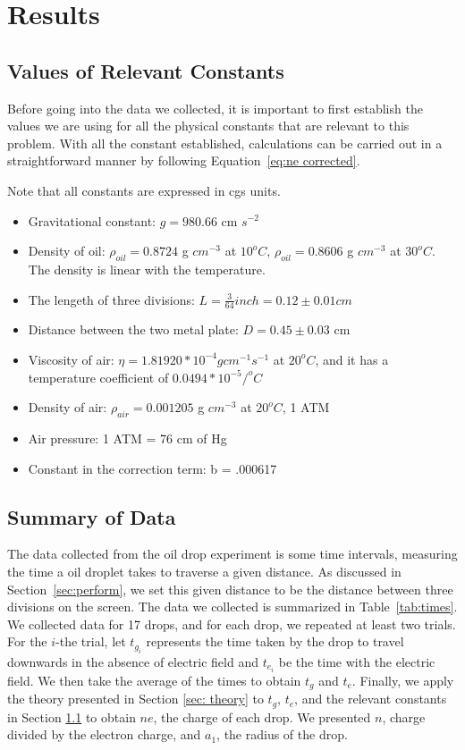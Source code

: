 \documentclass{article}
\begin{document}
\section{Results}

\subsection{Values of Relevant Constants}
\label{sec:constants}
Before going into the data we collected, it is important to first establish the values we are using for all the physical constants that are relevant to this problem. With all the constant established, calculations can be carried out in a straightforward manner by following Equation~\ref{eq:ne corrected}. 

Note that all constants are expressed in cgs units.

\begin{itemize}
    \item Gravitational constant: $g = 980.66$ cm $s^{-2}$
    \item Density of oil: $\rho_{oil} = 0.8724 $ g $cm^{-3}$ at $10^o C$, $\rho_{oil} = 0.8606 $ g $cm^{-3}$ at $30^o C$. The density is linear with the temperature.
    \item The lengeth of three divisions: $L = \frac{3}{64} inch = 0.12 \pm 0.01 cm$
    \item Distance between the two metal plate: $D = 0.45 \pm 0.03$ cm
    \item Viscosity of air: $\eta = 1.81920 *10^{-4} g cm^{-1} s^{-1}$ at $20^o C$, and it has a temperature coefficient of $0.0494 * 10^{-5} / ^o C$
    \item Density of air: $\rho_{air} = 0.001205 $ g $cm^{-3}$ at $20^o C$, 1 ATM
    \item Air pressure: 1 ATM = 76 cm of Hg
    \item Constant in the correction term: b = .000617
     
\end{itemize}

\subsection{Summary of Data}
\label{sec:summary}

The data collected from the oil drop experiment is some time intervals, measuring the time a oil droplet takes to traverse a given distance. As discussed in Section~\ref{sec:perform}, we set this given distance to be the distance between three divisions on the screen. The data we collected is summarized in Table~\ref{tab:times}. We collected data for 17 drops, and for each drop, we repeated at least two trials. For the $i$-the trial, let $t_{g_{i}}$ represents the time taken by the drop to travel downwards in the absence of electric field and  $t_{e_{i}}$ be the time with the electric field. We then take the average of the times to obtain $t_{g}$ and $t_{e}$. Finally, we apply the theory presented in Section \ref{sec: theory} to $t_{g}$, $t_{e}$, and the relevant constants in Section \ref{sec:constants} to obtain $ne$, the charge of each drop. We presented $n$, charge divided by the electron charge, and $a_1$, the radius of the drop.
\end{document}
